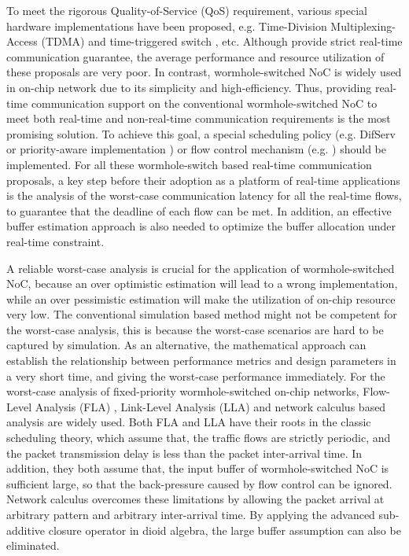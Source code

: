 \documentclass[10pt,journal]{IEEEtran}
\begin{document}
To meet the rigorous Quality-of-Service (QoS) requirement, various special hardware implementations have been proposed, e.g. Time-Division Multiplexing-Access (TDMA) \cite{GoDR05} and time-triggered switch \cite{4617280}, etc. Although provide strict real-time communication guarantee, the average performance and resource utilization of these proposals are very poor. In contrast, wormhole-switched NoC is widely used in on-chip network due to its simplicity and high-efficiency. Thus, providing real-time communication support on the conventional wormhole-switched NoC to meet both real-time and non-real-time communication requirements is the most promising solution. To achieve this goal, a special scheduling policy (e.g. DifServ \cite{1411140} or priority-aware implementation \cite{Shi:2008:RCA:1397757.1397996}\cite{708526}\cite{627905}) or flow control mechanism (e.g. \cite{Li199649}\cite{707545}) should be implemented. For all these wormhole-switch based real-time communication proposals, a key step before their adoption as a platform of real-time applications is the analysis of the worst-case communication latency for all the real-time flows, to guarantee that the deadline of each flow can be met. In addition, an effective buffer estimation approach is also needed to optimize the buffer allocation under real-time constraint.

A reliable worst-case analysis is crucial for the application of wormhole-switched NoC, because an over optimistic estimation will lead to a wrong implementation, while an over pessimistic estimation will make the utilization of on-chip resource very low. The conventional simulation based method might not be competent for the worst-case analysis, this is because the worst-case scenarios are hard to be captured by simulation. As an alternative, the mathematical approach can establish the relationship between performance metrics and design parameters in a very short time, and giving the worst-case performance immediately. For the worst-case analysis of fixed-priority wormhole-switched on-chip networks, Flow-Level Analysis (FLA) \cite{Shi:2008:RCA:1397757.1397996}, Link-Level Analysis (LLA) \cite{73}\cite{189} and network calculus \cite{Qian489900} based analysis are widely used. Both FLA and LLA have their roots in the classic scheduling theory, which assume that, the traffic flows are strictly periodic, and the packet transmission delay is less than the packet inter-arrival time. In addition, they both assume that, the input buffer of wormhole-switched NoC is sufficient large, so that the back-pressure caused by flow control can be ignored. Network calculus overcomes these limitations by allowing the packet arrival at arbitrary pattern and arbitrary inter-arrival time. By applying the advanced sub-additive closure operator in dioid algebra, the large buffer assumption can also be eliminated.
\end{document}
